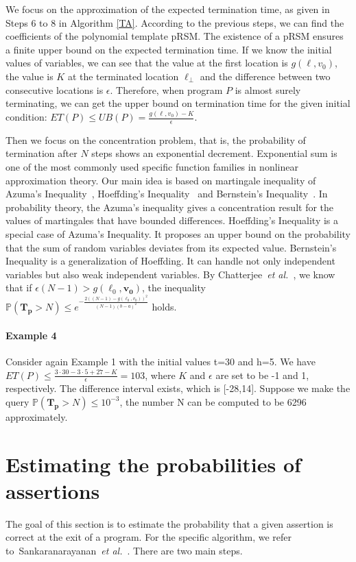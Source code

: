 \documentclass[runningheads]{llncs}
\begin{document}
We focus on the approximation of the expected termination time, as given in Steps 6 to 8 in Algorithm \ref{TA}. According to the previous steps, we can find the coefficients of the polynomial template pRSM. The existence of a pRSM ensures a finite upper bound on the expected termination time. If we know the initial values of variables, we can see that the value at the first location is $g(\ell, v_0)$, the value is $K$ at the terminated location $\ell_\bot$ and the difference between two consecutive locations is $\epsilon$.  Therefore, when program $P$ is almost surely terminating, we can get the upper bound on termination time for the given initial condition: $ET(P) \leq UB(P) = \frac{g(\ell, v_0)-K}{\epsilon}$. 

Then we focus on the concentration problem, that is, the probability of termination after $N$ steps shows an exponential decrement. Exponential sum is one of the most commonly used specific function families in nonlinear approximation theory. Our main idea is based on martingale inequality of Azuma's Inequality~\cite{Azuma1967}, Hoeffding's Inequality~\cite{Hoeffding1963,McDiarmid1998Concentration}  and Bernstein's Inequality~\cite{Bennett1962,McDiarmid1998Concentration}. In probability theory, the Azuma's inequality gives a concentration result for the values of martingales that have bounded differences. Hoeffding's Inequality is a special case of Azuma's Inequality. It proposes an upper bound on the probability that the sum of random variables deviates from its expected value. Bernstein's Inequality is a generalization of Hoeffding. It can handle not only independent variables but also weak independent variables. By Chatterjee~\emph{et al.}~\cite{cha2015algorithmic}, we know that if $\epsilon(N-1) > g(\ell_0,\boldsymbol{v_0})$, the inequality $\mathbb{P}(\bm{T_p} > N)\leq e^{-\frac{2((N-1)-g(\ell_0,v_0))^2}{(N-1)(b-a)^2}}$ holds. 

\paragraph{Example 4} Consider again Example 1 with the initial values t=30 and h=5. We have  $ET(P) \leq \frac{3\cdot 30-3\cdot 5+27-K}{\epsilon}=103$, where $K$ and $\epsilon$ are set to be -1 and 1, respectively. The difference interval exists, which is [-28,14]. Suppose we make the query $\mathbb{P}(\bm{T_p} > N)\leq 10^{-3}$, the number N can be computed to be 6296  approximately.

\section{Estimating the probabilities of assertions}
The goal of this section is to estimate the probability that a given assertion is correct at the exit of a program. For the specific algorithm, we refer to~Sankaranarayanan~\emph{et al.}~\cite{Sankaranarayanan2013Static}. There are two main steps.
\end{document}
